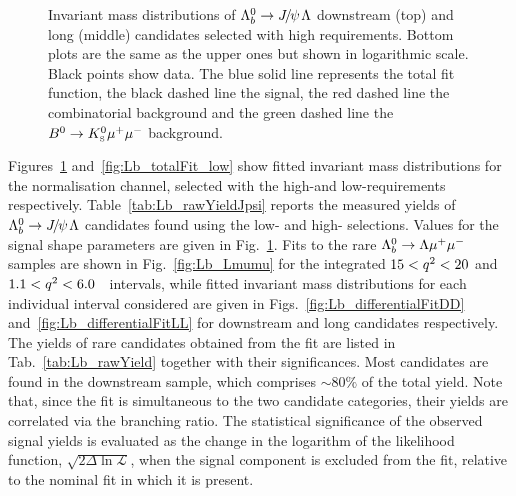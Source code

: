 \begin{figure}
\caption{Invariant mass distributions of $\Lb\ra\jpsi\Lz$ downstream (top) and long (middle) candidates
selected with high \qsq requirements.
Bottom plots are the same as the upper ones but shown in logarithmic scale. Black points show data.
The blue solid line represents the total fit function, the black dashed line the signal, the red dashed line
the combinatorial background and the green dashed line the $B^0\rightarrow K^0_{\rm\scriptscriptstyle S}\mu^+\mu^-$ background.}
\label{fig:Lb_totalFit}
\end{figure}
%
Figures~\ref{fig:Lb_totalFit} and~\ref{fig:Lb_totalFit_low} show fitted invariant mass distributions for
the normalisation channel, selected with the high-\qsq and low-\qsq requirements respectively.
Table~\ref{tab:Lb_rawYieldJpsi} reports the measured yields of $\Lb\ra\jpsi\Lz$ candidates found using the low- 
and \mbox{high-\qsq} selections. Values for the signal shape parameters are given in Fig.~\ref{fig:Lb_totalFit}.
Fits to the rare $\Lambda^0_b\rightarrow\Lambda\mu^+\mu^-$ samples are shown in Fig.~\ref{fig:Lb_Lmumu} for the integrated
$15 < q^2 < 20$ and $1.1 < q^2 < 6.0$~\gevgevcccc ~\qsq intervals, while
fitted invariant mass distributions for each individual \qsq interval considered are given in Figs.~\ref{fig:Lb_differentialFitDD}
and~\ref{fig:Lb_differentialFitLL} for downstream and long candidates respectively.
The yields of rare candidates obtained from the fit are listed in Tab.~\ref{tab:Lb_rawYield} together with their significances.
Most candidates are found in the downstream sample, which comprises $\sim 80\%$ of the total yield.
Note that, since the fit is simultaneous to the two candidate categories, their yields 
are correlated via the branching ratio.
The statistical significance of the observed signal yields is evaluated as the change in the logarithm 
of the likelihood function, $\sqrt{2\Delta\ln{\mathcal{L}}}$, when the signal component
is excluded from the fit, relative to the nominal fit in which it is present.

\begin{table}
\centering
\caption{Number of \decay{\Lb}{\jpsi\Lz} candidates in the downstream and
  long categories found using the for low- and
  high-\qsq requirements; uncertainties are statistical only.}
\label{tab:Lb_rawYieldJpsi}
\end{table}

